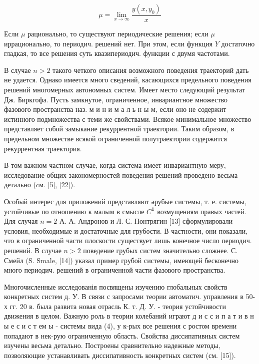 \documentclass[10pt]{article}
\begin{document}
\[

\mu=\lim _{x \rightarrow \infty} \frac{y\left(x, y_{0}\right)}{x}

\]



Если $\mu$ рационально, то существуют периодические решения; если $\mu$ иррационально, то периодич. решений нет. При этом, если функция $Y$ достаточно гладкая, то все решения суть квазипериодич. функции с двумя частотами.



В случае $n>2$ такого четкого описания возможного поведения траекторий дать не удается. Однако имеется много сведений, касающихся предельного поведения решений многомерных автономных систем. Имеет место следующий результат Дж. Биркгофа. Пусть замкнутое, ограниченное, инвариантное множество фазового пространства наз. м и н и м а л ь н ы м, если оно не содержит истинного подмножества с теми же свойствами. Всякое минимальное множество представляет собой замыкание рекуррентной траектории. Таким образом, в предельном множестве всякой ограниченной полутраектории содержится рекуррентная траектория.



В том важном частном случае, когда система имеет инвариантную меру, исследование общих закономерностей поведения решений проведено весьма детально (cм. [5], [22]).



Особый интерес для приложений представляют әрубые системы, т. е. системы, устойчивые по отношению к малым в смысле $C^{\mathbf{1}}$ возмущениям правых частей. Для случая $n=2$ А. А. Андронов и Л. С. Понтрягин [13] сформулировали условия, необходимые и достаточные для грубости. В частности, они показали, что в ограниченной части плоскости существует лишь конечное число периодич. решений. В случае $n>2$ поведение грубых систем значительно сложнее. С. Смейл (S. Smale, [14]) указал пример грубой системы, имеющей бесконечно много периодич. решений в ограниченной части фазового пространства.



Многочисленные исследованія посвящены изучению глобальных свойств конкретных систем д. У. В связи с запросами теории автоматич. управления в 50-х гг. 20 в. была развита новая отрасль К. т. Д. У. - теория устойчивости движения в целом. Важную роль в теории колебаний играют д и с с и п а т и в н ы е с и с т ем ы - системы вида (4), у к-рых все решения с ростом времени попадают в нек-рую ограниченную область. Свойства диссипативных систем изучены весьма детально. Построены сравнительно надежные методы, позволяющие устанавливать диссипативность конкретных систем (см. [15]).
\end{document}
